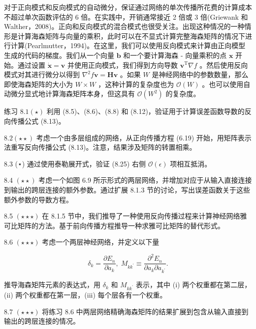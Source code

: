 \documentclass[10pt]{article}
\begin{document}
对于正向模式和反向模式的自动微分，保证通过网络的单次传播所花费的计算成本不超过单次函数评估的 6 倍。在实践中，开销通常接近 2 倍或 3 倍(Griewank 和 Walther，2008)。正向和反向模式的混合模式也很受关注。出现这种情况的一种情形是计算海森矩阵与向量的乘积，此时可以在不显式计算完整海森矩阵的情况下进行计算(Pearlmutter，1994)。在这里，我们可以使用反向模式来计算由正向模型生成的代码的梯度。我们从一个向量 \(\mathbf{b}\) 和一个要计算海森 - 向量乘积的点 \(\mathbf{x}\) 开始。通过设置 \(\dot{\mathbf{x}} = \mathbf{v}\) 并使用正向模式，我们得到方向导数 \({\mathbf{v}}^{\mathrm{T}}\nabla f\) 。然后使用反向模式对其进行微分以得到 \({\nabla }^{2}f\mathbf{v} = \mathbf{H}\mathbf{v}\) 。如果 \(W\) 是神经网络中的参数数量，那么即使海森矩阵的大小为 \(W \times  W\) ，这种计算的复杂度也为 \(\mathcal{O}\left( W\right)\) 。也可以使用自动微分显式地计算海森矩阵本身，但这具有 \(\mathcal{O}\left( {W}^{2}\right)\) 的复杂度。

练习 \({8.1}\left( \star \right)\) 利用 (8.5)、(8.6)、(8.8) 和 (8.12)，验证用于计算误差函数导数的反向传播公式 (8.13)。

\({8.2}\left( {\star  \star  }\right)\) 考虑一个由多层组成的网络，从正向传播方程 (6.19) 开始，用矩阵表示法重写反向传播公式 (8.13)。注意，结果涉及矩阵的转置相乘。

8.3 (⋆) 通过使用泰勒展开式，验证 (8.25) 右侧 \(\mathcal{O}\left( \epsilon \right)\) 项相互抵消。

8.4 \(\left( {\star  \star  }\right)\) 考虑一个如图 6.9 所示形式的两层网络，并增加对应于从输入直接连接到输出的跨层连接的额外参数。通过扩展 8.1.3 节的讨论，写出误差函数关于这些额外参数的导数方程。

8.5 \(\left( {\star  \star   \star  }\right)\) 在 8.1.5 节中，我们推导了一种使用反向传播过程来计算神经网络雅可比矩阵的方法。基于前向传播方程推导一种求雅可比矩阵的替代形式。

8.6 \(\left( {\star  \star   \star  }\right)\) 考虑一个两层神经网络，并定义以下量

\[
{\delta }_{k} = \frac{\partial {E}_{n}}{\partial {a}_{k}},\;{M}_{k{k}^{\prime }} \equiv  \frac{{\partial }^{2}{E}_{n}}{\partial {a}_{k}\partial {a}_{{k}^{\prime }}}. \tag{8.77}
\]

推导海森矩阵元素的表达式，用 \({\delta }_{k}\) 和 \({M}_{k{k}^{\prime }}\) 表示，其中 (i) 两个权重都在第二层，(ii) 两个权重都在第一层，(iii) 每个层各有一个权重。

8.7 \(\left( {\star  \star   \star  }\right)\) 将练习 8.6 中两层网络精确海森矩阵的结果扩展到包含从输入直接到输出的跨层连接的情况。
\end{document}
